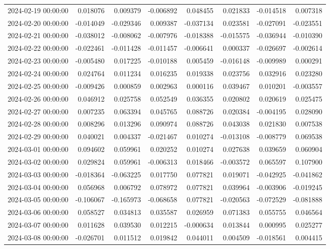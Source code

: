 \begin{tabular}{lrrrrrrr}
2024-02-19 00:00:00 & 0.018076 & 0.009379 & -0.006892 & 0.048455 & 0.021833 & -0.014518 & 0.007318 \\
2024-02-20 00:00:00 & -0.014049 & -0.029346 & 0.009387 & -0.037134 & 0.023581 & -0.027091 & -0.023551 \\
2024-02-21 00:00:00 & -0.038012 & -0.008062 & -0.007976 & -0.018388 & -0.015575 & -0.036944 & -0.010390 \\
2024-02-22 00:00:00 & -0.022461 & -0.011428 & -0.011457 & -0.006641 & 0.000337 & -0.026697 & -0.002614 \\
2024-02-23 00:00:00 & -0.005480 & 0.017225 & -0.010188 & 0.005459 & -0.016148 & -0.009989 & 0.000291 \\
2024-02-24 00:00:00 & 0.024764 & 0.011234 & 0.016235 & 0.019338 & 0.023756 & 0.032916 & 0.023280 \\
2024-02-25 00:00:00 & -0.009426 & 0.000859 & 0.002963 & 0.000116 & 0.039467 & 0.010201 & -0.003557 \\
2024-02-26 00:00:00 & 0.046912 & 0.025758 & 0.052549 & 0.036355 & 0.020802 & 0.020619 & 0.025475 \\
2024-02-27 00:00:00 & 0.007235 & 0.063394 & 0.045765 & 0.088726 & 0.020384 & -0.004195 & 0.028090 \\
2024-02-28 00:00:00 & 0.008296 & 0.013296 & 0.090974 & 0.088726 & 0.043038 & 0.021830 & 0.007538 \\
2024-02-29 00:00:00 & 0.040021 & 0.004337 & -0.021467 & 0.010274 & -0.013108 & -0.008779 & 0.069538 \\
2024-03-01 00:00:00 & 0.094602 & 0.059961 & 0.020252 & 0.010274 & 0.027638 & 0.039659 & 0.060904 \\
2024-03-02 00:00:00 & 0.029824 & 0.059961 & -0.006313 & 0.018466 & -0.003572 & 0.065597 & 0.107900 \\
2024-03-03 00:00:00 & -0.018364 & -0.063225 & 0.017750 & 0.077821 & 0.019071 & -0.042925 & -0.041862 \\
2024-03-04 00:00:00 & 0.056968 & 0.006792 & 0.078972 & 0.077821 & 0.039964 & -0.003906 & -0.019245 \\
2024-03-05 00:00:00 & -0.106067 & -0.165973 & -0.068658 & 0.077821 & -0.020563 & -0.072529 & -0.081888 \\
2024-03-06 00:00:00 & 0.058527 & 0.034813 & 0.035587 & 0.026959 & 0.071383 & 0.055755 & 0.046564 \\
2024-03-07 00:00:00 & 0.011628 & 0.039530 & 0.012215 & -0.000634 & 0.013844 & 0.000995 & 0.025277 \\
2024-03-08 00:00:00 & -0.026701 & 0.011512 & 0.019842 & 0.044011 & 0.004509 & -0.018561 & 0.004415 \\

\end{tabular}
